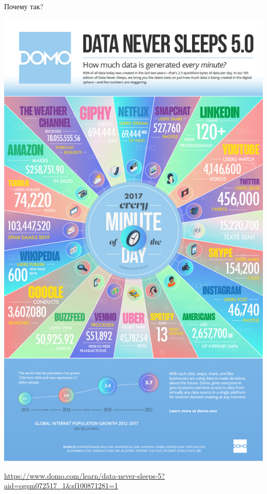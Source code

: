 \documentclass[9pt]{beamer}
\begin{document}
\begin{frame}{Почему так?}
\begin{center}
    \includegraphics[height=0.7\textheight]{img/intro_data_every_minute.png}
\end{center}
\url{https://www.domo.com/learn/data-never-sleeps-5?aid=ogsm072517_1&sf100871281=1}
\end{frame}
\end{document}
